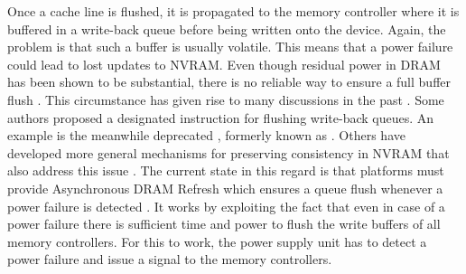 
Once a cache line is flushed, it is propagated to the memory controller where it
is buffered in a write-back queue before being written onto the device. Again,
the problem is that such a buffer is usually volatile. This means that a power
failure could lead to lost updates to NVRAM. Even though residual power in DRAM
has been shown to be substantial, there is no reliable way to ensure a full
buffer flush \cite{halderman2008lest}. This circumstance has given rise to many
discussions in the past \cite{condit2009better, dulloor2014system,
kolli2016high}. Some authors proposed a designated instruction for flushing
write-back queues. An example is the meanwhile deprecated ,
formerly known as  \cite{dulloor2014system, oukid2015instant,
schwalb2015nvm_malloc, volos2017whisper}. Others have developed more general
mechanisms for preserving consistency in NVRAM that also address this issue
\cite{condit2009better, pelley2014memory}. The current state in this regard is
that platforms must provide Asynchronous DRAM Refresh which ensures a queue
flush whenever a power failure is detected \cite{volos2017whisper}. It works by
exploiting the fact that even in case of a power failure there is sufficient
time and power to flush the write buffers of all memory controllers. For this to
work, the power supply unit has to detect a power failure and issue a signal to
the memory controllers.


